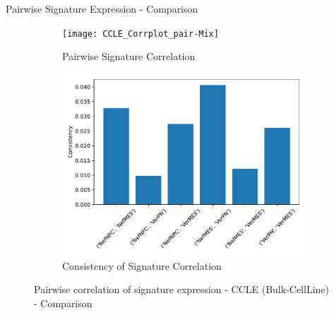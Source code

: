 \documentclass[aspectratio=169,9pt]{beamer}
\begin{document}
    \begin{frame}{Pairwise Signature Expression - Comparison}
        \begin{adjustwidth}{-5cm}{-5cm}
            \centering
            \begin{figure}\ContinuedFloat
                \centering
                \begin{subfigure}[c]{0.7\textwidth}
                    \centering
                    \texttt{[image: CCLE\_Corrplot\_pair-Mix]}
                    \caption{Pairwise Signature Correlation}
                \end{subfigure}
                \begin{subfigure}[c]{0.4\textwidth}
                    \centering
                    \includegraphics[width=\textwidth]{CCLE_Consistency_Mix}
                    \caption{Consistency of Signature Correlation}
                \end{subfigure}
                \caption{Pairwise correlation of signature expression - CCLE (Bulk-CellLine) - Comparison}
            \end{figure}
        \end{adjustwidth}
    \end{frame}
\end{document}
